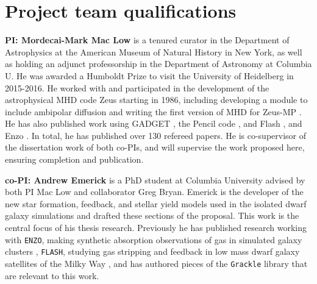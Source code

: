 \documentclass[11pt]{article}
\begin{document}
\section{Project team qualifications}

\textbf{PI: Mordecai-Mark Mac Low}  is a tenured curator in the Department of Astrophysics at the American
Museum of Natural History in New York, as well as holding an adjunct professorship in the Department of 
Astronomy at Columbia U.  He was awarded a Humboldt Prize to visit the University of Heidelberg in 2015-2016.
He worked with and participated in the
development of the astrophysical MHD code Zeus starting in 1986, including
developing a module to include ambipolar diffusion
\citep{MacLow1995,MacLowSmith1997} and writing the first version of MHD
for Zeus-MP 
\citep{Hayes2006}.  He has also published work using GADGET 
\citep{Li2005,Li2005a,Li2006},
the Pencil code 
\citep{Oishi2007,Johansen2007,Johansen2009,Yang2009,OishiMacLow2009,McNally2014}, and
Flash 
\citep{Joung2006,Joung2009,Peters2010,Peters2010a,Peters2010b,Peters2011,Peters2012,Hill2012,Gatto2015,Girichidis2016SImulatingOutflows,Ibanez-Mejia2016}, and Enzo \citep{Simpson2013}.
In
total, he has published over 130 refereed papers. He is co-supervisor of the dissertation work of both co-PIs, and
will supervise the work proposed here, ensuring completion and publication.

\textbf{co-PI: Andrew Emerick} is a PhD student at Columbia University advised by both PI Mac Low and collaborator Greg Bryan. Emerick is the developer of the new star formation, feedback, and stellar yield models used in the isolated dwarf galaxy simulations and drafted these sections of the proposal. This work is the central focus of his thesis research. Previously he has published research working with \texttt{ENZO}, making synthetic absorption observations of gas in simulated galaxy clusters \citep{Emerick2015}, \texttt{FLASH}, studying gas stripping and feedback in low mass dwarf galaxy satellites of the Milky Way \citep{Emerick2016}, and has authored pieces of the \texttt{Grackle} library \citep{Grackle} that are relevant to this work.
\end{document}
